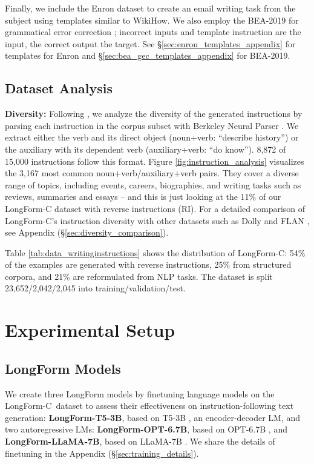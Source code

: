 	Finally, we include the Enron dataset to create an email writing task from the subject using templates similar to WikiHow. We also employ the BEA-2019 for grammatical error correction \cite{bryant-etal-2019-bea}; incorrect inputs and template instruction are the input, the correct output the target. See \S\ref{sec:enron_templates_appendix} for templates for Enron  and
	\S\ref{sec:bea_gec_templates_appendix} 
for BEA-2019.

\subsection{Dataset Analysis}
	\textbf{Diversity:}
Following \citet{wang2022selfinstruct}, we analyze the diversity of the generated instructions by parsing each instruction in the corpus subset with Berkeley Neural Parser \cite{kitaev-klein-2018-constituency}. We extract either the verb and its direct object (noun+verb: ``describe history'') or the auxiliary with its dependent verb (auxiliary+verb: ``do know''). 8,872 of 15,000 instructions follow this format. Figure \ref{fig:instruction_analysis}
visualizes the 3,167 most common noun+verb/auxiliary+verb pairs. They cover a diverse range of topics, including events, careers, biographies, and writing tasks such as reviews, summaries and essays -- and this is just looking at the 11\% of our LongForm-C dataset with reverse instructions (RI). For a detailed comparison of LongForm-C's instruction diversity with other datasets such as Dolly \citep{DatabricksBlog2023DollyV2} and FLAN \citep{chung2022scaling}, see Appendix (\S\ref{sec:diversity_comparison}).

        Table \ref{tab:data_writinginstructions}
shows the distribution of LongForm-C:
54\% of the examples are generated with reverse instructions,  25\%  from structured corpora, and
 21\% are reformulated from NLP tasks. The dataset is split 23,652/2,042/2,045 into training/validation/test.

	\section{Experimental Setup}
	\subsection{LongForm Models}

We create three LongForm models by finetuning language models on the LongForm-C\ dataset to assess their effectiveness on instruction-following text generation:
\textbf{LongForm-T5-3B}, based on T5-3B \cite{JMLR:v21:20-074_raffel_t5,
	lester-etal-2021-power}, an encoder-decoder LM, and two autoregressive LMs:
\textbf{LongForm-OPT-6.7B}, based on OPT-6.7B \cite{zhang2022opt}, and \textbf{LongForm-LLaMA-7B}, based on LLaMA-7B \cite{touvron2023llama}. We share the details of finetuning in the Appendix (\S\ref{sec:training_details}).

